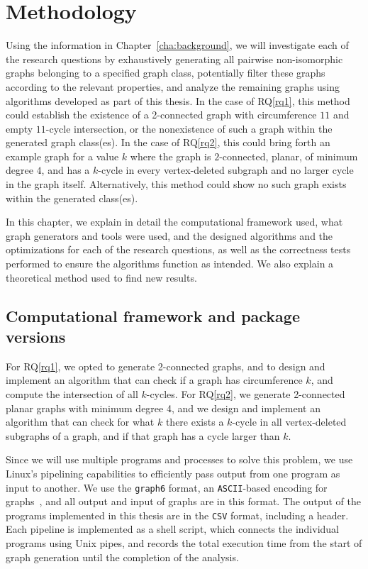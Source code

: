 \chapter{Methodology}
\label{cha:methodology}

Using the information in Chapter~\ref{cha:background}, we will investigate each of the research questions by exhaustively generating all pairwise non-isomorphic graphs belonging to a specified graph class, potentially filter these graphs according to the relevant properties, and analyze the remaining graphs using algorithms developed as part of this thesis. In the case of RQ\ref{rq1}, this method could establish the existence of a 2-connected graph with circumference $11$ and empty $11$-cycle intersection, or the nonexistence of such a graph within the generated graph class(es). In the case of RQ\ref{rq2}, this could bring forth an example graph for a value $k$ where the graph is $2$-connected, planar, of minimum degree $4$, and has a $k$-cycle in every vertex-deleted subgraph and no larger cycle in the graph itself. Alternatively, this method could show no such graph exists within the generated class(es).

In this chapter, we explain in detail the computational framework used, what graph generators and tools were used, and the designed algorithms and the optimizations for each of the research questions, as well as the correctness tests performed to ensure the algorithms function as intended. We also explain a theoretical method used to find new results.

\section{Computational framework and package versions}

For RQ\ref{rq1}, we opted to generate 2-connected graphs, and to design and implement an algorithm that can check if a graph has circumference $k$, and compute the intersection of all $k$-cycles. For RQ\ref{rq2}, we generate 2-connected planar graphs with minimum degree 4, and we design and implement an algorithm that can check for what $k$ there exists a $k$-cycle in all vertex-deleted subgraphs of a graph, and if that graph has a cycle larger than $k$.

Since we will use multiple programs and processes to solve this problem, we use Linux's pipelining capabilities to efficiently pass output from one program as input to another. We use the \texttt{graph6} format, an \texttt{ASCII}-based encoding for graphs~\cite{article:jorik-jooken}, and all output and input of graphs are in this format. The output of the programs implemented in this thesis are in the \texttt{CSV} format, including a header. Each pipeline is implemented as a shell script, which connects the individual programs using Unix pipes, and records the total execution time from the start of graph generation until the completion of the analysis.

